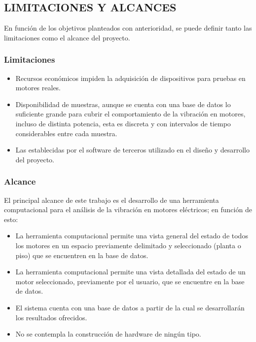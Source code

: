 
\subsection{LIMITACIONES Y ALCANCES}
    En función de los objetivos planteados con anterioridad, se puede definir
    tanto las limitaciones como el alcance del proyecto.

\subsubsection{Limitaciones}
\begin{itemize}
    \item Recursos económicos impiden la adquisición de dispositivos para
        pruebas en motores reales.

    \item Disponibilidad de muestras, aunque se cuenta con una base de datos lo
        suficiente grande para cubrir el comportamiento de la vibración en
        motores, incluso de distinta potencia, esta es discreta y con
        intervalos de tiempo considerables entre cada muestra.


    \item Las establecidas por el software de terceros utilizado en el diseño
        y desarrollo del proyecto.
\end{itemize}

\subsubsection{Alcance}
    El principal alcance de este trabajo es el desarrollo de una herramienta
    computacional para el análisis de la vibración en motores eléctricos; en
    función de esto:

	\begin{itemize}
        \item La herramienta computacional permite una vista general del estado
            de todos los motores en un espacio previamente delimitado y
            seleccionado (planta o piso) que se encuentren en la base de datos.

        \item La herramienta computacional permite una vista detallada del
            estado de un motor seleccionado, previamente por el usuario, que se
            encuentre en la base de datos.

        \item El sistema cuenta con una base de datos a partir de la cual se
            desarrollarán los resultados ofrecidos.

        \item No se contempla la construcción de hardware de ningún tipo.


	\end{itemize}
